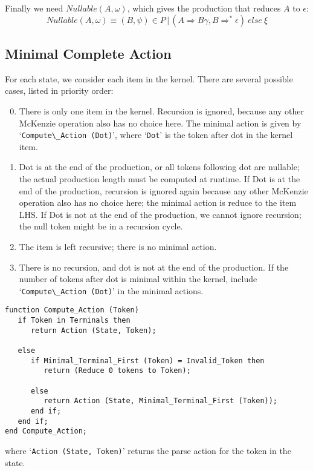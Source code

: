\documentclass{article}
\newcommand{\code}[1]{`\lstinline|#1|'}
\begin{document}
Finally we need $Nullable(A, \omega)$, which gives the production that
reduces $A$ to $\epsilon$:
\begin{equation}
Nullable(A, \omega) \equiv (B, \psi) \in P\, |\, (A \Rightarrow B \gamma, B \Rightarrow^* \epsilon)\ else\ \xi
\end{equation}

\subsection{Minimal Complete Action}
For each state, we consider each item in the kernel. There are
several possible cases, listed in priority order:
\begin{enumerate}
  \setcounter{enumi}{-1}

\item There is only one item in the kernel. Recursion is
  ignored, because any other McKenzie operation also has no choice
  here. The minimal action is given by \code{Compute\_Action (Dot)},
  where \code{Dot} is the token after dot in the kernel item.

\item Dot is at the end of the production, or all tokens following dot
  are nullable; the actual production length must be computed at
  runtime. If Dot is at the end of the production, recursion is
  ignored again because any other McKenzie operation also has no
  choice here; the minimal action is reduce to the item LHS. If Dot is
  not at the end of the production, we cannot ignore recursion; the
  null token might be in a recursion cycle.

\item The item is left recursive; there is no minimal action.

\item There is no recursion, and dot is not at the end of the
  production. If the number of tokens after dot is minimal within the
  kernel, include \code{Compute\_Action (Dot)} in the minimal actions.

\end{enumerate}
\begin{lstlisting}
function Compute_Action (Token)
   if Token in Terminals then
      return Action (State, Token);

   else
      if Minimal_Terminal_First (Token) = Invalid_Token then
         return (Reduce 0 tokens to Token);

      else
         return Action (State, Minimal_Terminal_First (Token));
      end if;
   end if;
end Compute_Action;
\end{lstlisting}
where \code{Action (State, Token)} returns the parse action for
the token in the state.
\end{document}
